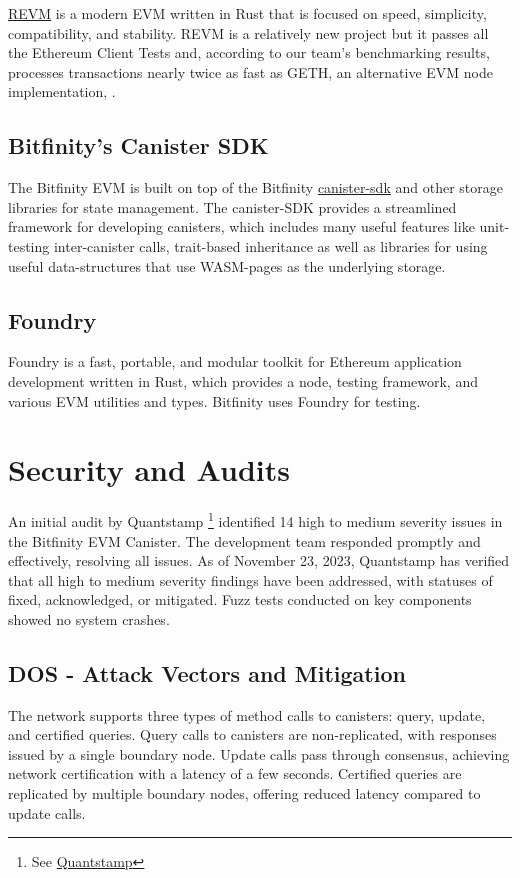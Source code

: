 \documentclass{article}
\begin{document}
\href{https://github.com/bluealloy/revm REVM}{REVM} is a modern EVM written in Rust that is focused on speed, simplicity, compatibility, and stability. REVM is a relatively new project but it passes all the Ethereum Client Tests and, according to our team's benchmarking results, processes transactions nearly twice as fast as GETH, an alternative EVM node implementation, .

\subsection{Bitfinity's Canister SDK}
The Bitfinity EVM is built on top of the Bitfinity \href{https://bitfinity.network/canister-sdk bitfinity-network/canister-sdk}{canister-sdk} and other storage libraries for state management. The canister-SDK provides a streamlined framework for developing canisters, which includes many useful features like unit-testing inter-canister calls, trait-based inheritance as well as libraries for using useful data-structures that use WASM-pages as the underlying storage. 

\subsection{Foundry} Foundry is a  fast, portable, and modular toolkit for Ethereum application development written in Rust, which provides a node, testing framework, and various EVM utilities and types. Bitfinity uses Foundry for testing. 

\clearpage 

\section{Security and Audits}

An initial audit by Quantstamp \footnote{See \href{https://quantstamp.com/}{Quantstamp}} identified 14 high to medium severity issues in the Bitfinity EVM Canister. The development team responded promptly and effectively, resolving all issues. As of November 23, 2023, Quantstamp has verified that all high to medium severity findings have been addressed, with statuses of fixed, acknowledged, or mitigated. Fuzz tests conducted on key components showed no system crashes. 

\subsection{DOS - Attack Vectors and Mitigation}
The network supports three types of method calls to canisters: query, update, and certified queries. Query calls to canisters are non-replicated, with responses issued by a single boundary node. Update calls pass through consensus, achieving network certification with a latency of a few seconds. Certified queries are replicated by multiple boundary nodes, offering reduced latency compared to update calls.
\end{document}
